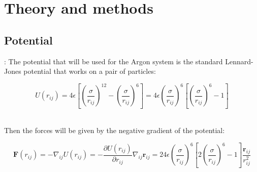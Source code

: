 \documentclass{beamer}
\begin{document}
	\section{Theory and methods}
	
		\subsection{Potential}
		
			\begin{frame}{\secname : \subsecname}
				The potential that will be used for the Argon system is the standard Lennard-Jones potential that works on a pair of particles:
		
				\begin{equation}U\left(r_{ij}\right)=4\epsilon\left[\left(\frac{\sigma}{r_{ij}}\right)^{12}-\left(\frac{\sigma}{r_{ij}}\right)^6\right]=4\epsilon\left(\frac{\sigma}{r_{ij}}\right)^6\left[\left(\frac{\sigma}{r_{ij}}\right)^6-1\right]\end{equation}\
			
			
				Then the forces will be given by the negative gradient of the potential:
		
				\begin{equation}\mathbf{F}\left(r_{ij}\right)=-\nabla_{ij}U\left(r_{ij}\right)=-\frac{\partial U\left(r_{ij}\right)}{\partial r_{ij}}\nabla_{ij}\mathbf{r}_{ij}=24\epsilon\left(\frac{\sigma}{r_{ij}}\right)^6\left[2\left(\frac{\sigma}{r_{ij}}\right)^6-1\right]\frac{\mathbf{r}_{ij}}{r_{ij}^2}\end{equation}
			\end{frame}
		
\end{document}
